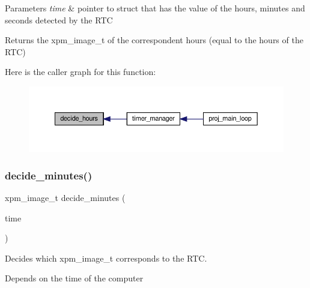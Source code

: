 \begin{DoxyParams}{Parameters}
{\em time} & pointer to struct that has the value of the hours, minutes and seconds detected by the R\+TC\\
\hline
\end{DoxyParams}
\begin{DoxyReturn}{Returns}
the xpm\+\_\+image\+\_\+t of the correspondent hours (equal to the hours of the R\+TC) 
\end{DoxyReturn}
Here is the caller graph for this function\+:
\nopagebreak
\begin{figure}[H]
\begin{center}
\leavevmode
\includegraphics[width=350pt]{group__loading__xpms_ga62a40150916b92b39ae83d800e3612f1_icgraph}
\end{center}
\end{figure}
\mbox{\label{group__loading__xpms_gae641aba4324c1f6c45eccb9d01822bd4}} 
\subsubsection{\texorpdfstring{decide\+\_\+minutes()}{decide\_minutes()}}
{\footnotesize\ttfamily xpm\+\_\+image\+\_\+t decide\+\_\+minutes (\begin{DoxyParamCaption}\item[{\hyperlink{structrtc__time}{rtc\+\_\+time} $\ast$}]{time }\end{DoxyParamCaption})}



Decides which xpm\+\_\+image\+\_\+t corresponds to the R\+TC. 

Depends on the time of the computer


